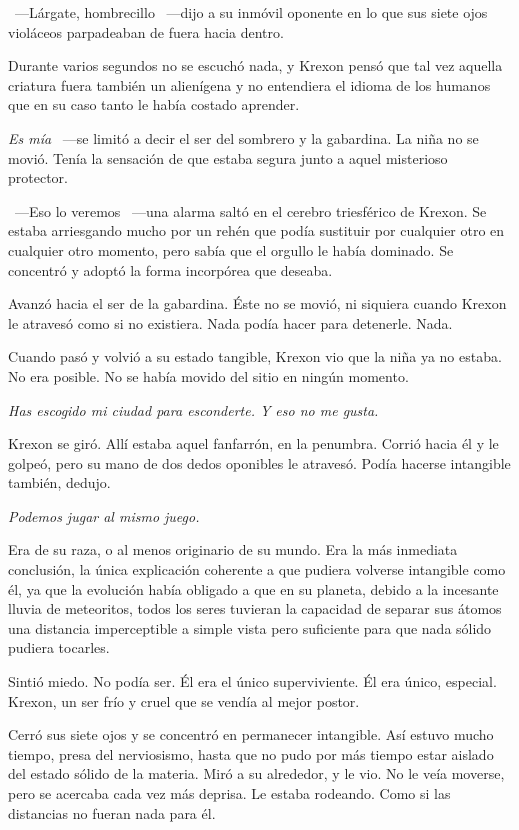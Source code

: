~---Lárgate, hombrecillo ~---dijo a su inmóvil oponente en lo que sus siete ojos violáceos parpadeaban de fuera hacia dentro.

Durante varios segundos no se escuchó nada, y Krexon pensó que tal vez aquella criatura fuera también un alienígena y no entendiera el idioma de los humanos que en su caso tanto le había costado aprender.

\emph{Es mía} ~---se limitó a decir el ser del sombrero y la gabardina. La niña no se movió. Tenía la sensación de que estaba segura junto a aquel misterioso protector.

~---Eso lo veremos ~---una alarma saltó en el cerebro triesférico de Krexon. Se estaba arriesgando mucho por un rehén que podía sustituir por cualquier otro en cualquier otro momento, pero sabía que el orgullo le había dominado. Se concentró y adoptó la forma incorpórea que deseaba.

Avanzó hacia el ser de la gabardina. Éste no se movió, ni siquiera cuando Krexon le atravesó como si no existiera. Nada podía hacer para detenerle. Nada.

Cuando pasó y volvió a su estado tangible, Krexon vio que la niña ya no estaba. No era posible. No se había movido del sitio en ningún momento.

\emph{Has escogido mi ciudad para esconderte. Y eso no me gusta.}

Krexon se giró. Allí estaba aquel fanfarrón, en la penumbra. Corrió hacia él y le golpeó, pero su mano de dos dedos oponibles le atravesó. Podía hacerse intangible también, dedujo.

\emph{Podemos jugar al mismo juego.}

Era de su raza, o al menos originario de su mundo. Era la más inmediata conclusión, la única explicación coherente a que pudiera volverse intangible como él, ya que la evolución había obligado a que en su planeta, debido a la incesante lluvia de meteoritos, todos los seres tuvieran la capacidad de separar sus átomos una distancia imperceptible a simple vista pero suficiente para que nada sólido pudiera tocarles.

Sintió miedo. No podía ser. Él era el único superviviente. Él era único, especial. Krexon, un ser frío y cruel que se vendía al mejor postor.

Cerró sus siete ojos y se concentró en permanecer intangible. Así estuvo mucho tiempo, presa del nerviosismo, hasta que no pudo por más tiempo estar aislado del estado sólido de la materia. Miró a su alrededor, y le vio. No le veía moverse, pero se acercaba cada vez más deprisa. Le estaba rodeando. Como si las distancias no fueran nada para él.

